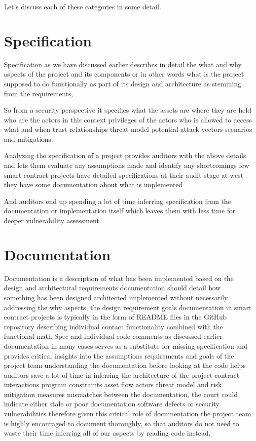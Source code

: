 Let's discuss each of these categories in some detail.

\section{Specification}

Specification as we have discussed earlier describes in detail the what and why aspects of the project and its components or in other words what is the project supposed to do functionally as part of its design and architecture as stemming from the requirements, 

So from a security perspective it specifies what the assets are where they are held who are the actors in this context privileges of the actors who is allowed to access what and when trust relationships threat model potential attack vectors scenarios and mitigations.

Analyzing the specification of a project provides auditors with the above details and lets them evaluate any assumptions made and identify any shortcomings few smart contract projects have detailed specifications at their audit stage at west they have some documentation about what is implemented 

And auditors end up spending a lot of time inferring specification from the documentation or implementation itself which leaves them with less time for deeper vulnerability assessment.

\section{Documentation}

Documentation is a description of what has been implemented based on the design and architectural requirements documentation should detail how something has been designed architected implemented without necessarily addressing the why aspects, the design requirement goals documentation in smart contract projects is typically in the form of README files in the GitHub repository describing individual contact functionality combined with the functional math Spec and individual code comments as discussed earlier documentation in many cases serves as a substitute for missing specification and provides critical insights into the assumptions requirements and goals of the project team understanding the documentation before looking at the code helps auditors save a lot of time in inferring the architecture of the project contract interactions program constraints asset flow actors threat model and risk mitigation measures mismatches between the documentation, the court could indicate either stale or poor documentation software defects or security vulnerabilities therefore given this critical role of documentation the project team is highly encouraged to document thoroughly, so that auditors do not need to waste their time inferring all of our aspects by reading code instead.

